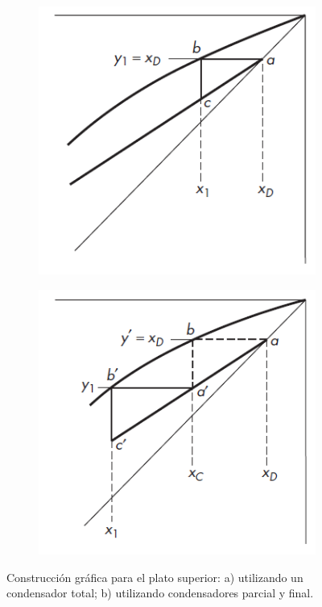 \documentclass[11pt]{book}
\begin{document}
\begin{figure}
  \begin{subfigure}[b]{0.45\textwidth}
    \includegraphics[width=\textwidth]{img/destilacion/PlatoSuperiorDiagrama_A.PNG}
    \caption{ }
    \label{Fig:PlatoSuperiorDiagrama_A}
  \end{subfigure}
  \hfill
  \begin{subfigure}[b]{0.45\textwidth}
    \includegraphics[width=\textwidth]{img/destilacion/PlatoSuperiorDiagrama_B.PNG}
    \caption{ }
    \label{Fig:PlatoSuperiorDiagrama_B}
  \end{subfigure}
  \caption{Construcción gráfica para el plato superior: a) utilizando un
condensador total; b) utilizando condensadores parcial y final.}
   \label{Fig:PlatoSuperiorDiagrama}
\end{figure}
\end{document}
